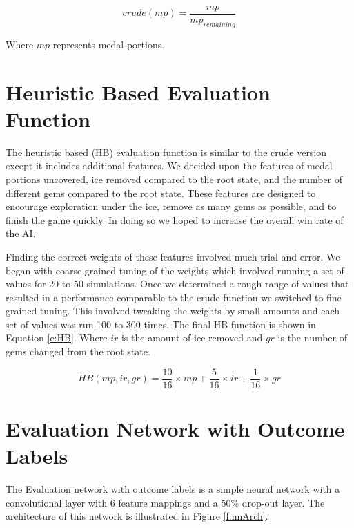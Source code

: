 \documentclass{bhamthesis}
\theoremstyle{definition}
\begin{document}
\begin{equation}\label{e:crude}
crude(mp) = \frac{mp}{mp_{remaining}}
\end{equation}

Where $mp$ represents medal portions.

\section{Heuristic Based Evaluation Function}\label{s:hbF}
The heuristic based (HB) evaluation function is similar to the crude version except it includes additional features. We decided upon the features of medal portions uncovered, ice removed compared to the root state, and the number of different gems compared to the root state. These features are designed to encourage exploration under the ice, remove as many gems as possible, and to finish the game quickly. In doing so we hoped to increase the overall win rate of the AI.

Finding the correct weights of these features involved much trial and error. We began with coarse grained tuning of the weights which involved running a set of values for 20 to 50 simulations. Once we determined a rough range of values that resulted in a performance comparable to the crude function we switched to fine grained tuning. This involved tweaking the weights by small amounts and each set of values was run 100 to 300 times. The final HB function is shown in Equation \ref{e:HB}. Where $ir$ is the amount of ice removed and $gr$ is the number of gems changed from the root state.

\begin{equation}\label{e:HB}
HB(mp, ir, gr)  = \frac{10}{16}\times mp + \frac{5}{16}\times ir + \frac{1}{16}\times gr
\end{equation}

\section{Evaluation Network with Outcome Labels}\label{s:nnOL}
The Evaluation network with outcome labels is a simple neural network with a convolutional layer with 6 feature mappings and a 50\% drop-out layer. The architecture of this network is illustrated in Figure \ref{f:nnArch}.
\end{document}

